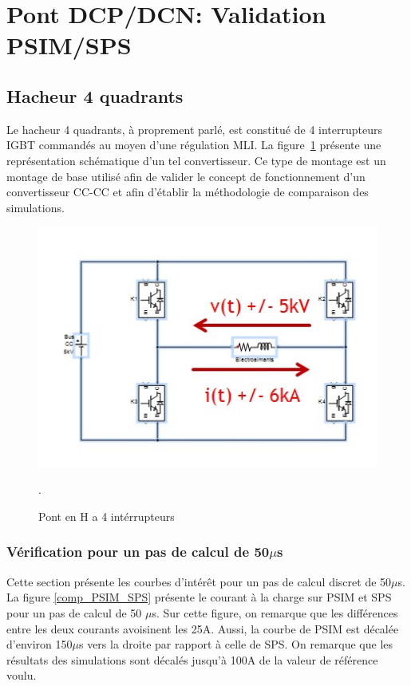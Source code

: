 \documentclass[11pt,letterpaper,final]{report}
\begin{document}
\section{Pont DCP/DCN: Validation PSIM/SPS}
\subsection{Hacheur 4 quadrants}
Le hacheur 4 quadrants, à proprement parlé, est constitué de 4 interrupteurs IGBT commandés au moyen d'une régulation MLI. La figure~\ref{hach} présente une représentation schématique d'un tel convertisseur. Ce type de montage est un montage de base utilisé afin de valider le concept de fonctionnement d'un convertisseur CC-CC et afin d'établir la méthodologie de comparaison des simulations.

\begin{figure}[htb]
\centering
\includegraphics[scale=1]{Fig/Hacheur4Quadrants/Hacheur.jpg}
\caption{Pont en H a 4 intérrupteurs}.
\label{hach}
\end{figure}

\subsubsection{Vérification pour un pas de calcul de 50$\mu$s}
Cette section présente les courbes d'intérêt pour un pas de calcul discret de 50$\mu$s. La figure \ref{comp_PSIM_SPS} présente le courant à la charge sur PSIM et SPS pour un pas de calcul de 50 $\mu$s. Sur cette figure, on remarque que les différences entre les deux courants avoisinent les 25A. Aussi, la courbe de PSIM est décalée d'environ 150$\mu$s vers la droite par rapport à celle de SPS. On remarque que les résultats des simulations sont décalés jusqu'à 100A de la valeur de référence voulu. 
\end{document}
